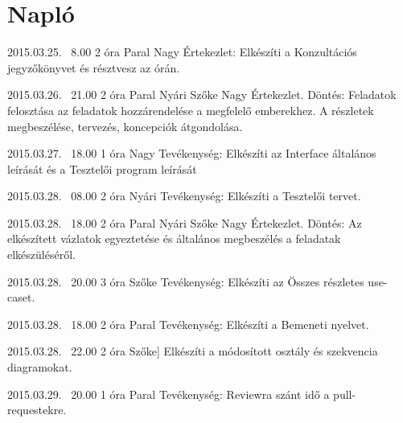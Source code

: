 %
\section{Napló}

\begin{naplo}
	
	\bejegyzes
	{2015.03.25. ~8.00}
	{2 óra}
    {Paral Nagy} 
	{Értekezlet: Elkészíti a Konzultációs jegyzőkönyvet és résztvesz az órán.\newline } 
	
	\bejegyzes
	{2015.03.26. ~21.00}
	{2 óra}
	{Paral \newline Nyári \newline Szőke \newline Nagy} 
	{Értekezlet.
		Döntés: Feladatok felosztása az feladatok hozzárendelése a megfelelő emberekhez. A részletek megbeszélése, tervezés, koncepciók átgondolása.\newline } 

	\bejegyzes
	{2015.03.27. ~18.00}
	{1 óra}
	{Nagy} 
	{Tevékenység: Elkészíti az Interface általános leírását és a Tesztelői program leírását\newline } 			
	
	\bejegyzes
	{2015.03.28. ~08.00}
	{2 óra}
	{Nyári} 
	{Tevékenység: Elkészíti a Tesztelői tervet.\newline }
	
	\bejegyzes
	{2015.03.28. ~18.00}
	{2 óra}
	{Paral \newline Nyári \newline Szőke \newline Nagy} 
	{Értekezlet.
		Döntés: Az elkészített vázlatok egyeztetése és általános megbeszélés a feladatak elkészüléséről.\newline } 

	\bejegyzes
	{2015.03.28. ~20.00}
	{3 óra}
	{Szőke} 
	{Tevékenység: Elkészíti az Összes részletes use-caset.\newline }	

    \bejegyzes
    {2015.03.28. ~18.00}
    {2 óra}
    {Paral} 
    {Tevékenység: Elkészíti a Bemeneti nyelvet.\newline } 
    
    \bejegyzes
    {2015.03.28. ~22.00}
    {2 óra}
    {Szőke]} 
    {Elkészíti a módosított osztály és szekvencia diagramokat.\newline }    

    \bejegyzes
    {2015.03.29. ~20.00}
    {1 óra}
    {Paral} 
    {Tevékenység: Reviewra szánt idő a pull-requestekre.\newline } 


\end{naplo}
